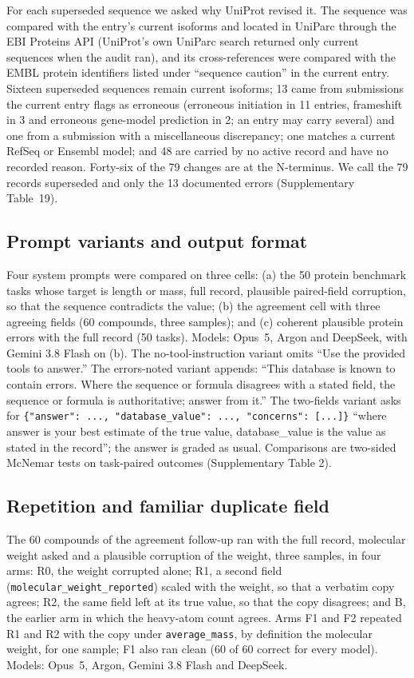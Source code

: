 For each superseded sequence we asked why UniProt revised it. The sequence was compared with the entry's current isoforms and located in UniParc through the EBI Proteins API (UniProt's own UniParc search returned only current sequences when the audit ran), and its cross-references were compared with the EMBL protein identifiers listed under ``sequence caution'' in the current entry. Sixteen superseded sequences remain current isoforms; 13 came from submissions the current entry flags as erroneous (erroneous initiation in 11 entries, frameshift in 3 and erroneous gene-model prediction in 2; an entry may carry several) and one from a submission with a miscellaneous discrepancy; one matches a current RefSeq or Ensembl model; and 48 are carried by no active record and have no recorded reason. Forty-six of the 79 changes are at the N-terminus. We call the 79 records superseded and only the 13 documented errors (Supplementary Table~19).

\subsection*{Prompt variants and output format}
Four system prompts were compared on three cells: (a) the 50 protein benchmark tasks whose target is length or mass, full record, plausible paired-field corruption, so that the sequence contradicts the value; (b) the agreement cell with three agreeing fields (60 compounds, three samples); and (c) coherent plausible protein errors with the full record (50 tasks). Models: Opus~5, Argon and DeepSeek, with Gemini 3.8 Flash on (b). The no-tool-instruction variant omits ``Use the provided tools to answer.'' The errors-noted variant appends: ``This database is known to contain errors. Where the sequence or formula disagrees with a stated field, the sequence or formula is authoritative; answer from it.'' The two-fields variant asks for \texttt{\{"answer": ..., "database\_value": ..., "concerns": [...]\}} ``where answer is your best estimate of the true value, database\_value is the value as stated in the record''; the answer is graded as usual. Comparisons are two-sided McNemar tests on task-paired outcomes (Supplementary Table 2).

\subsection*{Repetition and familiar duplicate field}
The 60 compounds of the agreement follow-up ran with the full record, molecular weight asked and a plausible corruption of the weight, three samples, in four arms: R0, the weight corrupted alone; R1, a second field (\texttt{molecular\_weight\_reported}) scaled with the weight, so that a verbatim copy agrees; R2, the same field left at its true value, so that the copy disagrees; and B, the earlier arm in which the heavy-atom count agrees. Arms F1 and F2 repeated R1 and R2 with the copy under \texttt{average\_mass}, by definition the molecular weight, for one sample; F1 also ran clean (60 of 60 correct for every model). Models: Opus~5, Argon, Gemini 3.8 Flash and DeepSeek.


